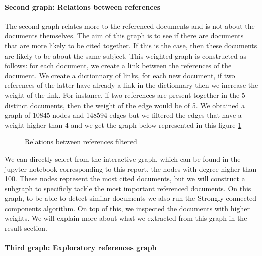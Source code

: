 \documentclass[article,twocolumn]{IEEEtran}
\begin{document}
    \hypertarget{second-graph-relations-between-references}{%
\paragraph{Second graph: Relations between
references}\label{second-graph-relations-between-references}}

The second graph relates more to the referenced documents and is not
about the documents themselves. The aim of this graph is to see if there
are documents that are more likely to be cited together. If this is the
case, then these documents are likely to be about the same subject. This
weighted graph is constructed as follows: for each document, we create a
link between the references of the document. We create a dictionnary of
links, for each new document, if two references of the latter have
already a link in the dictionnary then we increase the weight of the
link. For instance, if two references are present together in the 5
distinct documents, then the weight of the edge would be of 5. We
obtained a graph of 10845 nodes and 148594 edges but we filtered the
edges that have a weight higher than 4 and we get the graph below
represented in this figure \ref{fig6}




    \begin{figure}
        \begin{center}\end{center}
        \caption{Relations between references filtered}
        \label{fig6}
    \end{figure}
    
    We can directly select from the interactive graph, which can be found in
the jupyter notebook corresponding to this report, the nodes with degree
higher than 100. These nodes represent the most cited documents, but we
will construct a subgraph to specificly tackle the most important
referenced documents. On this graph, to be able to detect similar
documents we also run the Strongly connected components algorithm. On
top of this, we inspected the documents with higher weights. We will
explain more about what we extracted from this graph in the result
section.

    \hypertarget{third-graph-exploratory-references-graph}{%
\paragraph{Third graph: Exploratory references
graph}\label{third-graph-exploratory-references-graph}}
\end{document}

